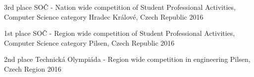 


\begin{cvhonors}
			
	\cvhonor
	{3rd place} %
	{SOČ - Nation wide competition of Student Professional Activities, Computer Science category} %
	{Hradec Králové, Czech Republic} %
	{2016} %
			
	\cvhonor
	{1st place} %
	{SOČ - Region wide competition of Student Professional Activities, Computer Science category} %
	{Pilsen, Czech Republic} %
	{2016} %
			
	\cvhonor
	{2nd place} %
	{Technická Olympiáda - Region wide competition in engineering} %
	{Pilsen, Czech Region} %
	{2016} %
			
\end{cvhonors}